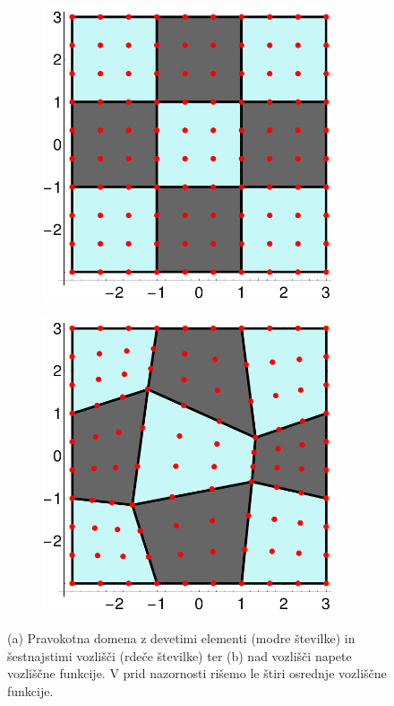 \begin{figure}[ht]
   \centering
   \begin{subfigure}[b]{0.42\textwidth}
      \centering
      \includegraphics[width=0.94\textwidth]{Slike/layout2d}
      \vspace{0mm}
      \caption{}
   \end{subfigure}
   \hspace{5mm}
   \begin{subfigure}[b]{0.42\textwidth}
      \centering
      \includegraphics[width=0.94\textwidth]{Slike/layout2dTrans}
      \caption{}
   \end{subfigure}
   \caption{(a) Pravokotna domena z devetimi elementi (modre številke) in šestnajstimi vozlišči (rdeče številke) ter (b) nad vozlišči napete vozliščne funkcije. V prid nazornosti rišemo le štiri osrednje vozliščne funkcije.}
   \label{fig:regionAndNodeFunctions}
\end{figure}

